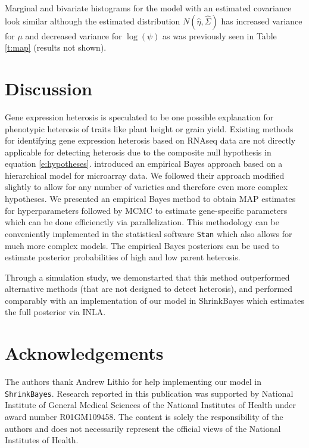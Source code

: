 \documentclass[useAMS,usenatbib,referee]{biom}
\begin{document}
Marginal and bivariate histograms for the model with an estimated covariance look similar although the estimated distribution $N(\hat{\eta},\hat{\Sigma})$ has increased variance for $\mu$ and decreased variance for $\log(\psi)$ as was previously seen in Table \ref{t:map} (results not shown). 

\section{Discussion}
\label{s:discussion}

Gene expression heterosis is speculated to be one possible explanation for phenotypic
heterosis of traits like plant height or grain yield. Existing methods for identifying gene expression heterosis based on RNAseq data are not directly applicable for detecting heterosis due to the composite null hypothesis in equation \eqref{e:hypotheses}. \cite{ji2014estimation} introduced an empirical Bayes approach based on a hierarchical model for microarray data. We followed their approach modified slightly to allow for any number of varieties and therefore even more complex hypotheses. We presented an empirical Bayes method to obtain MAP estimates for hyperparameters followed by MCMC to estimate gene-specific parameters which can be done efficienctly via parallelization. This methodology can be conveniently implemented in the statistical software {\tt Stan} which also allows for much more complex models. The empirical Bayes posteriors can be used to estimate posterior probabilities of high and low parent heterosis. 

Through a simulation study, we demonstarted that this method outperformed alternative methods (that are not designed to detect heterosis), and performed comparably with an implementation of our model in ShrinkBayes which estimates the full posterior via INLA. 




\backmatter %

\section*{Acknowledgements}

The authors thank Andrew Lithio for help implementing our model in {\tt ShrinkBayes}. Research reported in this publication was supported by National Institute of General Medical Sciences of the National Institutes of Health under award number R01GM109458. The content is solely the responsibility of the authors and does not necessarily represent the official views of the National Institutes of Health.
\end{document}
